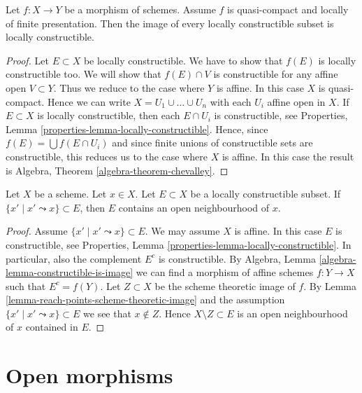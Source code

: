 \begin{theorem}
\label{theorem-chevalley}
Let $f : X \to Y$ be a morphism of schemes.
Assume $f$ is quasi-compact and locally of finite presentation.
Then the image of every locally constructible subset is locally constructible.
\end{theorem}

\begin{proof}
Let $E \subset X$ be locally constructible.
We have to show that $f(E)$ is locally constructible too.
We will show that $f(E) \cap V$ is constructible for any affine
open $V \subset Y$. Thus we reduce to the case where $Y$ is affine.
In this case $X$ is quasi-compact. Hence we can write
$X = U_1 \cup \ldots \cup U_n$ with each $U_i$ affine open in $X$.
If $E \subset X$ is locally constructible, then each $E \cap U_i$
is constructible, see
Properties, Lemma \ref{properties-lemma-locally-constructible}.
Hence, since $f(E) = \bigcup f(E \cap U_i)$ and since finite unions of
constructible sets are constructible, this reduces us to the case where $X$
is affine. In this case the result is
Algebra, Theorem \ref{algebra-theorem-chevalley}.
\end{proof}

\begin{lemma}
\label{lemma-constructible-containing-open}
Let $X$ be a scheme. Let $x \in X$. Let $E \subset X$ be a locally
constructible subset. If $\{x' \mid x' \leadsto x\} \subset E$,
then $E$ contains an open neighbourhood of $x$.
\end{lemma}

\begin{proof}
Assume $\{x' \mid x' \leadsto x\} \subset E$.
We may assume $X$ is affine.
In this case $E$ is constructible, see
Properties, Lemma \ref{properties-lemma-locally-constructible}.
In particular, also the complement $E^c$ is constructible. By
Algebra, Lemma \ref{algebra-lemma-constructible-is-image}
we can find a morphism of affine schemes $f : Y \to X$ such that
$E^c = f(Y)$. Let $Z \subset X$ be the scheme theoretic image of $f$. By
Lemma \ref{lemma-reach-points-scheme-theoretic-image}
and the assumption $\{x' \mid x' \leadsto x\} \subset E$
we see that $x \not \in Z$. Hence $X \setminus Z \subset E$ is an
open neighbourhood of $x$ contained in $E$.
\end{proof}




\section{Open morphisms}
\label{section-open}

